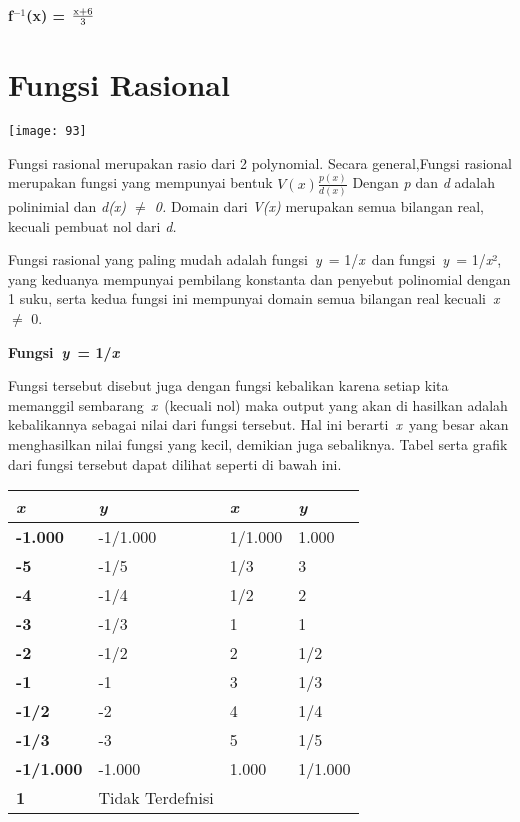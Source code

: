 \documentclass[11pt,fleqn]{book} %
\begin{document}
\begin{myEnumerate}
\begin{itemize}
\noindent 
\paragraph{f${}^{-1}$(x) = $\frac{{\rm x}+6}{3} $   }

\noindent 

\noindent

\section{Fungsi Rasional}

\begin{center}
\texttt{[image: 93]}
\end{center}

\noindent \textbf{}

Fungsi rasional merupakan rasio dari 2 polynomial. Secara general,Fungsi rasional merupakan fungsi yang mempunyai bentuk $V(x)\frac{p(x)}{d(x)}$ Dengan \textit{p }dan \textit{d }adalah polinimial dan \textit{d(x) $\neq$ 0. }Domain dari\textit{ V(x) }merupakan semua bilangan real, kecuali pembuat nol dari\textit{ d.} 

Fungsi rasional yang paling mudah adalah fungsi~\textit{y}~= 1/\textit{x}~dan fungsi~\textit{y}~= 1/\textit{x}², yang keduanya mempunyai pembilang konstanta dan penyebut polinomial dengan 1 suku, serta kedua fungsi ini mempunyai domain semua bilangan real kecuali~\textit{x}~$\mathrm{\neq}$ 0.

\noindent \textbf{Fungsi~\textit{y}~= 1/\textit{x}}

Fungsi tersebut disebut juga dengan fungsi kebalikan karena setiap kita memanggil sembarang~\textit{x}~(kecuali nol) maka output yang akan di hasilkan adalah kebalikannya sebagai nilai dari fungsi tersebut. Hal ini berarti~\textit{x}~yang besar akan menghasilkan nilai fungsi yang kecil, demikian juga sebaliknya. Tabel serta grafik dari fungsi tersebut dapat dilihat seperti di bawah ini.

\begin{tabular}{|p{1.1in}|p{1.1in}|p{1.1in}|p{1.1in}|} \hline 
\textbf{\textit{x}} & \textbf{\textit{y}} & \textbf{\textit{x}} & \textbf{\textit{y}} \\ \hline 
\textbf{-1.000} & -1/1.000 & 1/1.000 & 1.000 \\ \hline 
\textbf{-5} & -1/5 & 1/3 & 3 \\ \hline 
\textbf{-4} & -1/4 & 1/2 & 2 \\ \hline 
\textbf{-3} & -1/3 & 1 & 1 \\ \hline 
\textbf{-2} & -1/2 & 2 & 1/2 \\ \hline 
\textbf{-1} & -1 & 3 & 1/3 \\ \hline 
\textbf{-1/2} & -2 & 4 & 1/4 \\ \hline 
\textbf{-1/3} & -3 & 5 & 1/5 \\ \hline 
\textbf{-1/1.000} & -1.000 & 1.000 & 1/1.000 \\ \hline 
\textbf{1} & Tidak Terdefnisi &  &  \\ \hline 
\end{tabular}



\end{itemize}
\end{myEnumerate}
\end{document}

